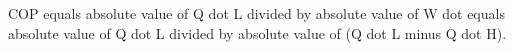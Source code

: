 COP equals absolute value of Q dot L divided by absolute value of W dot equals absolute value of Q dot L divided by absolute value of (Q dot L minus Q dot H).